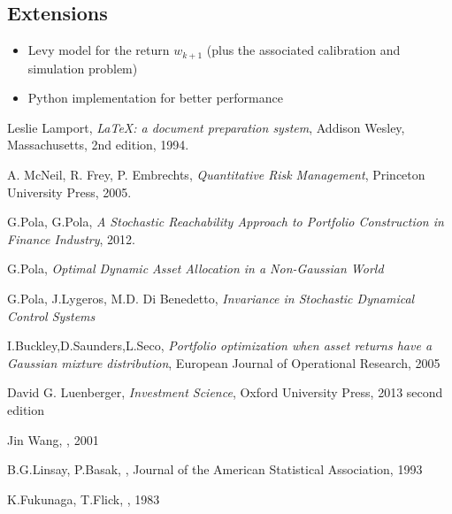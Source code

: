 \documentclass[]{article}
\begin{document}
\subsection{Extensions}
\begin{itemize}
	\item Levy model for the return $ w_{k+1}$ (plus the associated calibration and simulation problem)
	\item Python implementation for better performance
\end{itemize}
\begin{thebibliography}{9}
	
	Leslie Lamport,
	\textit{\LaTeX: a document preparation system},
	Addison Wesley, Massachusetts,
	2nd edition,
	1994.
	
	A. McNeil, R. Frey, P. Embrechts,
	\textit{Quantitative Risk Management},
	Princeton University Press,
	2005.
	
	G.Pola, G.Pola,
	\textit{A Stochastic Reachability Approach to Portfolio Construction in Finance Industry},
	2012.
	
	G.Pola,
	\textit{Optimal Dynamic Asset Allocation in a Non-Gaussian World}
	
	
	G.Pola, J.Lygeros, M.D. Di Benedetto,
	\textit{Invariance in Stochastic Dynamical Control Systems}
	
	I.Buckley,D.Saunders,L.Seco,
	\textit{Portfolio optimization when asset returns have a Gaussian mixture distribution},
	European Journal of Operational Research,
	2005
	
	David G. Luenberger,
	\textit{Investment Science},
	Oxford University Press,
	2013 second edition
	
	Jin Wang,
	,
	2001
	
	B.G.Linsay, P.Basak,
	,
	Journal of the American Statistical Association,
	1993
	
	K.Fukunaga, T.Flick,
	,
	1983
\end{thebibliography}
\end{document}

